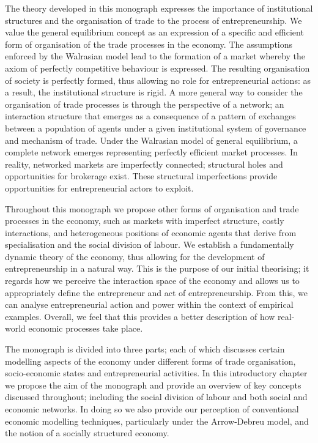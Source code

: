 The theory developed in this monograph expresses the importance of institutional structures and the organisation of trade to the process of entrepreneurship. We value the general equilibrium concept as an expression of a specific and efficient form of organisation of the trade processes in the economy. The assumptions enforced by the Walrasian model lead to the formation of a market whereby the axiom of perfectly competitive behaviour is expressed. The resulting organisation of society is perfectly formed, thus allowing no role for entrepreneurial actions: as a result, the institutional structure is rigid. A more general way to consider the organisation of trade processes is through the perspective of a network; an interaction structure that emerges as a consequence of a pattern of exchanges between a population of agents under a given institutional system of governance and mechanism of trade. Under the Walrasian model of general equilibrium, a complete network emerges representing perfectly efficient market processes. In reality, networked markets are imperfectly connected; structural holes and opportunities for brokerage exist. These structural imperfections provide opportunities for entrepreneurial actors to exploit.

Throughout this monograph we propose other forms of organisation and trade processes in the economy, such as markets with imperfect structure, costly interactions, and heterogeneous positions of economic agents that derive from specialisation and the social division of labour. We establish a fundamentally dynamic theory of the economy, thus allowing for the development of entrepreneurship in a natural way. This is the purpose of our initial theorising; it regards how we perceive the interaction space of the economy and allows us to appropriately define the entrepreneur and act of entrepreneurship. From this, we can analyse entrepreneurial action and power within the context of empirical examples. Overall, we feel that this provides a better description of how real-world economic processes take place.

The monograph is divided into three parts; each of which discusses certain modelling aspects of the economy under different forms of trade organisation, socio-economic states and entrepreneurial activities. In this introductory chapter we propose the aim of the monograph and provide an overview of key concepts discussed throughout; including the social division of labour and both social and economic networks. In doing so we also provide our perception of conventional economic modelling techniques, particularly under the Arrow-Debreu model, and the notion of a socially structured economy.

